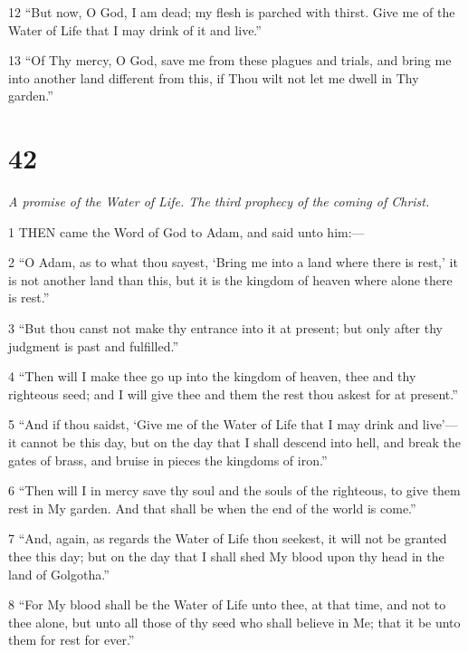 \par 12 “But now, O God, I am dead; my flesh is parched with thirst. Give me of the Water of Life that I may drink of it and live.”

\par 13 “Of Thy mercy, O God, save me from these plagues and trials, and bring me into another land different from this, if Thou wilt not let me dwell in Thy garden.”

\chapter{42}

\par \textit{A promise of the Water of Life. The third prophecy of the coming of Christ.}

\par 1 THEN came the Word of God to Adam, and said unto him:—

\par 2 “O Adam, as to what thou sayest, ‘Bring me into a land where there is rest,’ it is not another land than this, but it is the kingdom of heaven where alone there is rest.”

\par 3 “But thou canst not make thy entrance into it at present; but only after thy judgment is past and fulfilled.”

\par 4 “Then will I make thee go up into the kingdom of heaven, thee and thy righteous seed; and I will give thee and them the rest thou askest for at present.”

\par 5 “And if thou saidst, ‘Give me of the Water of Life that I may drink and live’—it cannot be this day, but on the day that I shall descend into hell, and break the gates of brass, and bruise in pieces the kingdoms of iron.”

\par 6 “Then will I in mercy save thy soul and the souls of the righteous, to give them rest in My garden. And that shall be when the end of the world is come.”

\par 7 “And, again, as regards the Water of Life thou seekest, it will not be granted thee this day; but on the day that I shall shed My blood upon thy head in the land of Golgotha.”

\par 8 “For My blood shall be the Water of Life unto thee, at that time, and not to thee alone, but unto all those of thy seed who shall believe in Me; that it be unto them for rest for ever.”


